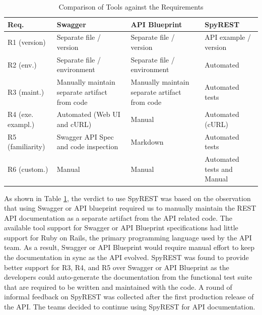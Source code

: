 \documentclass[10pt, conference]{IEEEtran}
\begin{document}
\begin{table}[!tbh]
\caption{Comparison of Tools against the Requirements}
  \label{table:compare}
\begin{tabular}{|p{0.5in} | p{0.8in}| p{0.8in}|p{0.8in}|}

\hline
\textbf{Req}. & \textbf{Swagger} & \textbf{API Blueprint} & \textbf{SpyREST} \\
\hline
R1 (version) & Separate file / version & Separate file / version & API example / version \\
\hline
R2 (env.)& Separate file / environment & Separate file / environment & Automated \\
\hline
R3 (maint.)& Manually maintain separate artifact from code & Manually maintain separate artifact from code & Automated tests \\
\hline
R4 (exe. exampl.)& Automated (Web UI and cURL) & Manual & Automated (cURL) \\
\hline
R5 (familiarity)& Swagger API Spec and code inspection & Markdown & Automated tests \\
\hline
R6 (custom.)& Manual & Manual & Automated tests and Manual \\
\hline
\end{tabular}
\end{table}

As shown in Table \ref{table:compare}, the verdict to use SpyREST was based on the observation that using Swagger or API blueprint required us to manually maintain the REST API documentation as a separate artifact from the API related code. The available tool support for Swagger or API Blueprint specifications had little support for Ruby on Rails, the primary programming language used by the API team. As a result, Swagger or API Blueprint would require manual effort to keep the documentation in sync as the API evolved. SpyREST was found to provide better support for R3, R4, and R5 over Swagger or API Blueprint as the developers could auto-generate the documentation from the functional test suite that are required to be written and maintained with the code. A round of informal feedback on SpyREST was collected after the first production release of the API. The teams decided to continue using SpyREST for API documentation.
\end{document}
